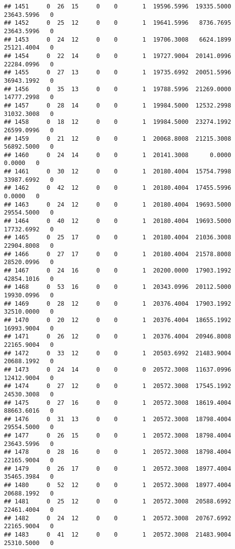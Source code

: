 \documentclass[
]{article}
\begin{document}
\begin{enumerate}
\begin{verbatim}
## 1451     0  26  15     0    0       1  19596.5996  19335.5000  23643.5996   0
## 1452     0  25  12     0    0       1  19641.5996   8736.7695  23643.5996   0
## 1453     0  24  12     0    0       1  19706.3008   6624.1899  25121.4004   0
## 1454     0  22  14     0    0       1  19727.9004  20141.0996  22284.0996   0
## 1455     0  27  13     0    0       1  19735.6992  20051.5996  36943.1992   0
## 1456     0  35  13     0    0       1  19788.5996  21269.0000  14777.2998   0
## 1457     0  28  14     0    0       1  19984.5000  12532.2998  31032.3008   0
## 1458     0  18  12     0    0       1  19984.5000  23274.1992  26599.0996   0
## 1459     0  21  12     0    0       1  20068.8008  21215.3008  56892.5000   0
## 1460     0  24  14     0    0       1  20141.3008      0.0000      0.0000   0
## 1461     0  30  12     0    0       1  20180.4004  15754.7998  33987.6992   0
## 1462     0  42  12     0    0       1  20180.4004  17455.5996      0.0000   0
## 1463     0  24  12     0    0       1  20180.4004  19693.5000  29554.5000   0
## 1464     0  40  12     0    0       1  20180.4004  19693.5000  17732.6992   0
## 1465     0  25  17     0    0       1  20180.4004  21036.3008  22904.8008   0
## 1466     0  27  17     0    0       1  20180.4004  21578.8008  28520.0996   0
## 1467     0  24  16     0    0       1  20200.0000  17903.1992  42854.1016   0
## 1468     0  53  16     0    0       1  20343.0996  20112.5000  19930.0996   0
## 1469     0  28  12     0    0       1  20376.4004  17903.1992  32510.0000   0
## 1470     0  20  12     0    0       1  20376.4004  18655.1992  16993.9004   0
## 1471     0  26  12     0    0       1  20376.4004  20946.8008  22165.9004   0
## 1472     0  33  12     0    0       1  20503.6992  21483.9004  20688.1992   0
## 1473     0  24  14     0    0       0  20572.3008  11637.0996  12412.9004   0
## 1474     0  27  12     0    0       1  20572.3008  17545.1992  24530.3008   0
## 1475     0  27  16     0    0       1  20572.3008  18619.4004  88663.6016   0
## 1476     0  31  13     0    0       1  20572.3008  18798.4004  29554.5000   0
## 1477     0  26  15     0    0       1  20572.3008  18798.4004  23643.5996   0
## 1478     0  28  16     0    0       1  20572.3008  18798.4004  22165.9004   0
## 1479     0  26  17     0    0       1  20572.3008  18977.4004  35465.3984   0
## 1480     0  52  12     0    0       1  20572.3008  18977.4004  20688.1992   0
## 1481     0  25  12     0    0       1  20572.3008  20588.6992  22461.4004   0
## 1482     0  24  12     0    0       1  20572.3008  20767.6992  22165.9004   0
## 1483     0  41  12     0    0       1  20572.3008  21483.9004  25310.5000   0

\end{verbatim}
\end{enumerate}
\end{document}
